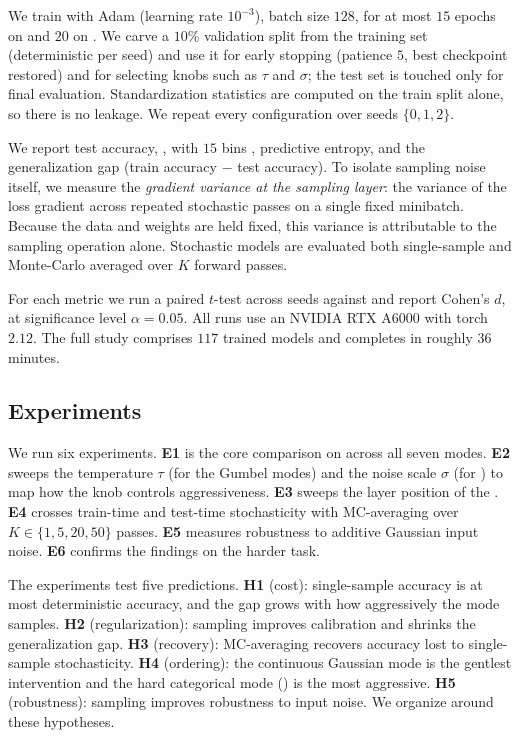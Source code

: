  We train with Adam (learning rate $10^{-3}$), batch size $128$, for at most $15$ epochs on \mnist and $20$ on \cifar. We carve a $10\%$ validation split from the training set (deterministic per seed) and use it for early stopping (patience $5$, best checkpoint restored) and for selecting knobs such as $\tau$ and $\sigma$; the test set is touched only for final evaluation. Standardization statistics are computed on the train split alone, so there is no leakage. We repeat every configuration over seeds $\{0,1,2\}$.

 We report test accuracy, \nll, \ece with $15$ bins \citep{guo2017calibration}, predictive entropy, and the generalization gap (train accuracy $-$ test accuracy). To isolate sampling noise itself, we measure the \emph{gradient variance at the sampling layer}: the variance of the loss gradient across repeated stochastic passes on a single fixed minibatch. Because the data and weights are held fixed, this variance is attributable to the sampling operation alone. Stochastic models are evaluated both single-sample and Monte-Carlo averaged over $K$ forward passes.

 For each metric we run a paired $t$-test across seeds against \detmode and report Cohen's $d$, at significance level $\alpha = 0.05$. All runs use an NVIDIA RTX A6000 with torch $2.12$. The full study comprises $117$ trained models and completes in roughly $36$ minutes.

\subsection{Experiments}\label{sec:method:exp}

 We run six experiments. \textbf{E1} is the core comparison on \mnist across all seven modes. \textbf{E2} sweeps the temperature $\tau$ (for the Gumbel modes) and the noise scale $\sigma$ (for \gaussnoise) to map how the knob controls aggressiveness. \textbf{E3} sweeps the layer position of the \samplinglayer. \textbf{E4} crosses train-time and test-time stochasticity with MC-averaging over $K \in \{1, 5, 20, 50\}$ passes. \textbf{E5} measures robustness to additive Gaussian input noise. \textbf{E6} confirms the findings on the harder \cifar task.

 The experiments test five predictions. \textbf{H1} (cost): single-sample accuracy is at most deterministic accuracy, and the gap grows with how aggressively the mode samples. \textbf{H2} (regularization): sampling improves calibration and shrinks the generalization gap. \textbf{H3} (recovery): MC-averaging recovers accuracy lost to single-sample stochasticity. \textbf{H4} (ordering): the continuous Gaussian mode is the gentlest intervention and the hard categorical mode (\gumbelst) is the most aggressive. \textbf{H5} (robustness): sampling improves robustness to input noise. We organize  around these hypotheses.
